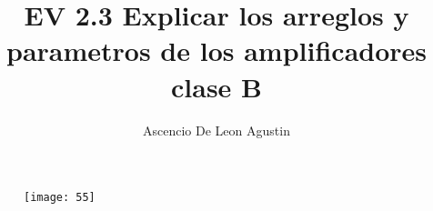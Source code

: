 \documentclass[10pt,letterpaper]{article}
\title{EV 2.3 Explicar los arreglos y parametros de los amplificadores clase B}
\author{Ascencio De Leon Agustin}
\begin{document}
\maketitle
\begin{figure}
\centering 
\texttt{[image: 55]}
\end{figure}
\end{document}
